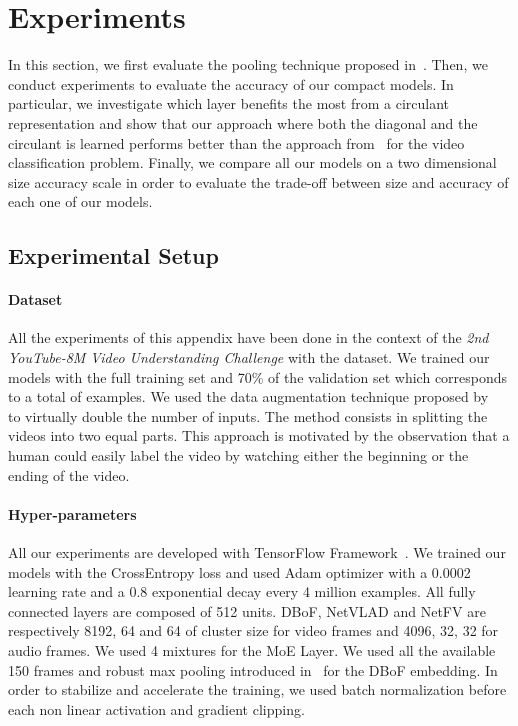 \section{Experiments}
\label{section:ap2-experiments}

In this section, we first evaluate the pooling technique proposed in~.
Then, we conduct experiments to evaluate the accuracy of our compact models.
In particular, we investigate which layer benefits the most from a circulant representation and show that our approach where both the diagonal and the circulant is learned performs better than the approach from~\citet{cheng2015exploration} for the video classification problem.
Finally, we compare all our models on a two dimensional size \vs accuracy scale in order to evaluate the trade-off between size and accuracy of each one of our models.


\subsection{Experimental Setup}
\label{subsection:ap2-experimental_setup}

\paragraph{Dataset}
All the experiments of this appendix have been done in the context of the \emph{2nd YouTube-8M Video Understanding Challenge} with the \yt dataset.
We trained our models with the full training set and 70\% of the validation set which corresponds to a total of  examples.
We used the data augmentation technique proposed by~\citet{skalic2017deep} to virtually double the number of inputs. 
The method consists in splitting the videos into two equal parts.
This approach is motivated by the observation that a human could easily label the video by watching either the beginning or the ending of the video. 

\paragraph{Hyper-parameters}
All our experiments are developed with TensorFlow Framework~\cite{tensorflow2015-whitepaper}.
We trained our models with the CrossEntropy loss and used Adam optimizer with a 0.0002 learning rate and a 0.8 exponential decay every 4 million examples.
All fully connected layers are composed of 512 units.
DBoF, NetVLAD and NetFV are respectively 8192, 64 and 64 of cluster size for video frames and 4096, 32, 32 for audio frames.
We used 4 mixtures for the MoE Layer.
We used all the available 150 frames and robust max pooling introduced in~ for the DBoF embedding.
In order to stabilize and accelerate the training, we used batch normalization before each non linear activation and gradient clipping. 

